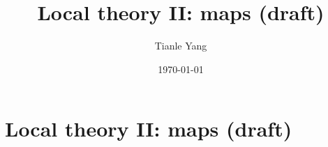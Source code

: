 \documentclass{noteformyself}
\title{Local theory II: maps (draft)}
\author{Tianle Yang}
\date{\today}
\begin{document}
    \maketitle

    \section{Local theory II: maps (draft)}



\end{document}

